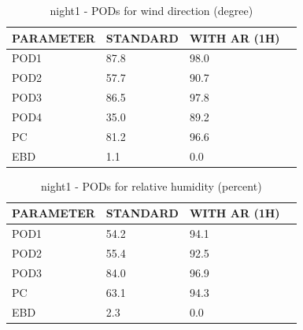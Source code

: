 \begin{table}[p!]
\begin{center}
\begin{tabular}{|l|l|l|l|}
\hline
\multicolumn{1}{|c|}{\cellcolor[HTML]{C0C0C0}\textbf{PARAMETER}} & \multicolumn{1}{c|}{\cellcolor[HTML]{C0C0C0}\textbf{STANDARD}} & \multicolumn{1}{c|}{\cellcolor[HTML]{C0C0C0}\textbf{WITH AR (1H)}} \\
\hline
\cellcolor[HTML]{C0C0C0}POD1  & 87.8      & 98.0     \\
\cellcolor[HTML]{C0C0C0}POD2  & 57.7      & 90.7     \\
\cellcolor[HTML]{C0C0C0}POD3  & 86.5      & 97.8     \\
\cellcolor[HTML]{C0C0C0}POD4  & 35.0      & 89.2     \\
\cellcolor[HTML]{C0C0C0}PC    & 81.2        & 96.6       \\
\cellcolor[HTML]{C0C0C0}EBD   & 1.1       & 0.0      \\
\hline
\end{tabular}
\caption{night1 - PODs for wind direction (degree)}
\label{tab:podwd:night1}
\end{center}
\end{table}
\begin{table}[p!]
\begin{center}
\begin{tabular}{|l|l|l|l|}
\hline
\multicolumn{1}{|c|}{\cellcolor[HTML]{C0C0C0}\textbf{PARAMETER}} & \multicolumn{1}{c|}{\cellcolor[HTML]{C0C0C0}\textbf{STANDARD}} & \multicolumn{1}{c|}{\cellcolor[HTML]{C0C0C0}\textbf{WITH AR (1H)}} \\
\hline
\cellcolor[HTML]{C0C0C0}POD1  & 54.2                                & 94.1         \\
\cellcolor[HTML]{C0C0C0}POD2  & 55.4                                & 92.5         \\
\cellcolor[HTML]{C0C0C0}POD3  & 84.0                                & 96.9         \\
\cellcolor[HTML]{C0C0C0}PC    & 63.1                                  & 94.3           \\
\cellcolor[HTML]{C0C0C0}EBD   & 2.3                                 & 0.0          \\
\hline
\end{tabular}
\caption{night1 - PODs for relative humidity (percent)}
\label{tab:podrh:night1}
\end{center}
\end{table}
